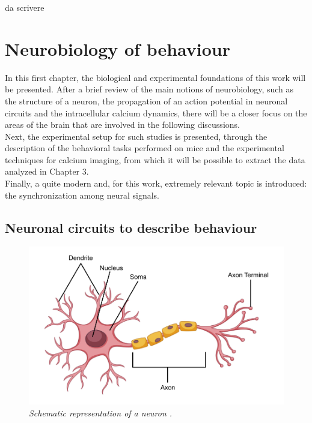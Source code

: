 \documentclass[12pt, a4paper]{report}
\begin{document}
	da scrivere
	



	
	




	\tableofcontents
	

	
	
	\newpage
	
	\chapter{Neurobiology of behaviour} \label{section 1.1}
	
	
	In this first chapter, the biological and experimental foundations of this work will be presented. After a brief review of the main notions of neurobiology, such as the structure of a neuron, the propagation of an action potential in neuronal circuits and the intracellular calcium dynamics, there will be a closer focus on the areas of the brain that are involved in the following discussions.\\
	Next, the experimental setup for such studies is presented, through the description of the behavioral tasks performed on mice and the experimental techniques for calcium imaging, from which it will be possible to extract the data analyzed in Chapter 3.\\
	Finally, a quite modern and, for this work, extremely relevant topic is introduced: the synchronization among neural signals.
	
	\section{Neuronal circuits to describe behaviour}
	
	\begin{figure}[H]
		\begin{center}
			\includegraphics[scale=.25]{neuron.png} 
		\end{center} 
		\caption{\textit{Schematic representation of a neuron \cite{42}.}} \label{neuron}
		
	\end{figure}
	
\end{document}
